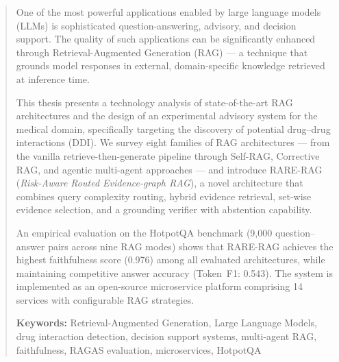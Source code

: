 \documentclass[pdflatex,en,11pt]{aghdpl}
\begin{document}
\begin{abstract}
One of the most powerful applications enabled by large language models (LLMs) is
sophisticated question-answering, advisory, and decision support.
The quality of such applications can be significantly enhanced through
Retrieval-Augmented Generation (RAG) --- a technique that grounds model responses
in external, domain-specific knowledge retrieved at inference time.

This thesis presents a technology analysis of state-of-the-art RAG architectures
and the design of an experimental advisory system for the medical domain,
specifically targeting the discovery of potential drug--drug interactions (DDI).
We survey eight families of RAG architectures --- from the vanilla
retrieve-then-generate pipeline through Self-RAG, Corrective RAG, and agentic
multi-agent approaches --- and introduce RARE-RAG
(\textit{Risk-Aware Routed Evidence-graph RAG}), a novel architecture that
combines query complexity routing, hybrid evidence retrieval, set-wise evidence
selection, and a grounding verifier with abstention capability.

An empirical evaluation on the HotpotQA benchmark (9{,}000 question--answer pairs
across nine RAG modes) shows that RARE-RAG achieves the highest faithfulness score
(0.976) among all evaluated architectures, while maintaining competitive answer
accuracy (Token~F1: 0.543). The system is implemented as an open-source
microservice platform comprising 14 services with configurable RAG strategies.

\bigskip
\noindent\textbf{Keywords:} Retrieval-Augmented Generation, Large Language Models,
drug interaction detection, decision support systems, multi-agent RAG, faithfulness,
RAGAS evaluation, microservices, HotpotQA
\end{abstract}


\tableofcontents
\clearpage

\listoffigures
\clearpage

\listoftables
\clearpage











\end{document}
